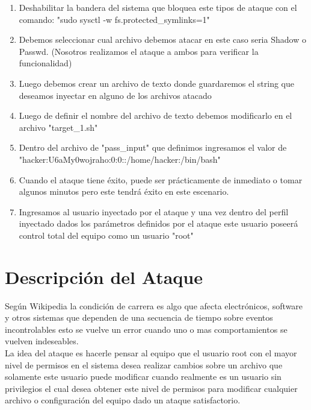 \documentclass{article}
\begin{document}
\begin{enumerate}
  \item Deshabilitar la bandera del sistema que bloquea este tipos de ataque con el comando: "sudo sysctl -w fs.protected\_symlinks=1"
  \item Debemos seleccionar cual archivo debemos atacar en este caso seria Shadow o Passwd. (Nosotros realizamos el ataque a ambos para verificar la funcionalidad)
  
  \item Luego debemos crear un archivo de texto donde guardaremos el string que deseamos inyectar en alguno de los archivos atacado
  \item Luego de definir el nombre del archivo de texto debemos modificarlo en el archivo "target\_1.sh"
  
  \item Dentro del archivo de "pass\_input" que definimos ingresamos el valor de "hacker:U6aMy0wojraho:0:0::/home/hacker:/bin/bash"
  
  \item Cuando el ataque tiene éxito, puede ser prácticamente de inmediato o tomar algunos minutos pero este tendrá éxito en este escenario.
  
  \item Ingresamos al usuario inyectado por el ataque y una vez dentro del perfil inyectado dados los parámetros definidos por el ataque este usuario poseerá control total del equipo como un usuario "root"
  
\end{enumerate}


\section*{Descripción del Ataque}

\tab Según Wikipedia la condición de carrera es algo que afecta electrónicos, software y otros sistemas que dependen de una secuencia de tiempo sobre eventos incontrolables esto se vuelve un error cuando uno o mas comportamientos se vuelven indeseables.
\\

La idea del ataque es hacerle pensar al equipo que el usuario root con el mayor nivel de permisos en el sistema desea realizar cambios sobre un archivo que solamente este usuario puede modificar cuando realmente es un usuario sin privilegios el cual desea obtener este nivel de permisos para modificar cualquier archivo o configuración del equipo dado un ataque satisfactorio.
\end{document}
